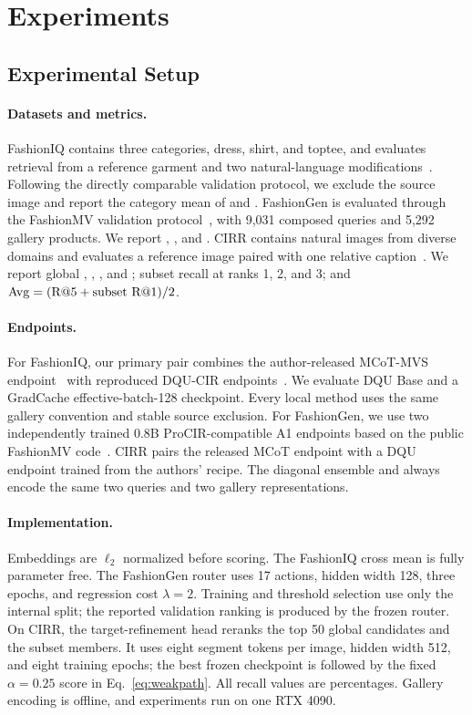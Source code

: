 \section{Experiments}
\label{sec:experiments}

\subsection{Experimental Setup}

\paragraph{Datasets and metrics.}
FashionIQ contains three categories, dress, shirt, and toptee, and evaluates retrieval from a reference garment and two natural-language modifications~\cite{wufashioniq}. Following the directly comparable validation protocol, we exclude the source image and report the category mean of \Rten and \Rfifty. FashionGen is evaluated through the FashionMV validation protocol~\cite{yuan2026fashionmv}, with 9,031 composed queries and 5,292 gallery products. We report \Rone, \Rfive, and \Rten. CIRR contains natural images from diverse domains and evaluates a reference image paired with one relative caption~\cite{liucirr}. We report global \Rone, \Rfive, \Rten, and \Rfifty; subset recall at ranks 1, 2, and 3; and $\mathrm{Avg}=(\mathrm{R@5}+\text{subset }\mathrm{R@1})/2$.

\paragraph{Endpoints.}
For FashionIQ, our primary pair combines the author-released MCoT-MVS endpoint~\cite{ge2026mcot} with reproduced DQU-CIR endpoints~\cite{wen2024dqu}. We evaluate DQU Base and a GradCache effective-batch-128 checkpoint. Every local method uses the same gallery convention and stable source exclusion. For FashionGen, we use two independently trained 0.8B ProCIR-compatible A1 endpoints based on the public FashionMV code~\cite{yuan2026fashionmv}. CIRR pairs the released MCoT endpoint with a DQU endpoint trained from the authors' recipe. The diagonal ensemble and \method always encode the same two queries and two gallery representations.

\paragraph{Implementation.}
Embeddings are $\ell_2$ normalized before scoring. The FashionIQ cross mean is fully parameter free. The FashionGen router uses 17 actions, hidden width 128, three epochs, and regression cost $\lambda=2$. Training and threshold selection use only the internal split; the reported validation ranking is produced by the frozen router. On CIRR, the target-refinement head reranks the top 50 global candidates and the subset members. It uses eight segment tokens per image, hidden width 512, and eight training epochs; the best frozen checkpoint is followed by the fixed $\alpha=0.25$ score in Eq.~\ref{eq:weakpath}. All recall values are percentages. Gallery encoding is offline, and experiments run on one RTX 4090.

